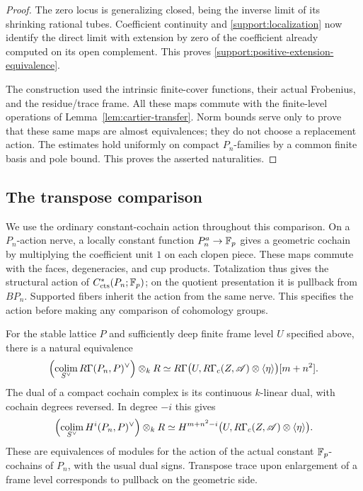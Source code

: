 \begin{proof}
The zero locus is generalizing closed, being the inverse limit
of its shrinking rational tubes.  Coefficient continuity and
\eqref{support:localization} now identify the direct limit with
extension by zero of the coefficient already computed on its
open complement.  This proves
\eqref{support:positive-extension-equivalence}.

The construction used the intrinsic finite-cover functions,
their actual Frobenius, and the residue/trace frame.  All these
maps commute with the finite-level operations of
Lemma~\ref{lem:cartier-transfer}.  Norm bounds serve only to
prove that these same maps are almost equivalences; they do
not choose a replacement action.  The estimates hold uniformly
on compact $P_n$-families by a common finite basis and pole
bound.  This proves the asserted naturalities.
\end{proof}

\subsection{The transpose comparison}

We use the ordinary constant-cochain action throughout this comparison.
On a $P_n$-action nerve, a locally constant function
$P_n^a\to\mathbb F_p$ gives a geometric cochain by multiplying the
coefficient unit $1$ on each clopen piece.  These maps commute with
the faces, degeneracies, and cup products.  Totalization thus gives
the structural action of $C^*_{\mathrm{cts}}(P_n;\mathbb F_p)$; on the
quotient presentation it is pullback from $BP_n$.  Supported fibers
inherit the action from the same nerve.  This specifies the action
before making any comparison of cohomology groups.

\begin{proposition}\label{prop:transpose-comparison}
For the stable lattice $P$ and sufficiently deep finite frame
level $U$ specified above, there is a natural equivalence
\begin{equation}\label{support:transpose-derived}
 \left(\operatorname*{colim}_{S^\vee}
    R\Gamma(P_n,P)^\vee\right)\otimes_kR
 \simeq
 R\Gamma\bigl(U,R\Gamma_c(Z,\mathscr A)
                     \otimes\langle\eta\rangle\bigr)[m+n^2].
\end{equation}
The dual of a compact cochain complex is its continuous
$k$-linear dual, with cochain degrees reversed.  In degree $-i$
this gives
\begin{equation}\label{support:transpose-cohomology}
 \left(\operatorname*{colim}_{S^\vee}H^i(P_n,P)^\vee\right)\otimes_kR
 \simeq
 H^{m+n^2-i}\bigl(U,R\Gamma_c(Z,\mathscr A)
                        \otimes\langle\eta\rangle\bigr).
\end{equation}
These are equivalences of modules for the action of the actual
constant $\mathbb F_p$-cochains of $P_n$, with the usual dual signs.
Transpose trace upon enlargement of a frame level corresponds
to pullback on the geometric side.
\end{proposition}

